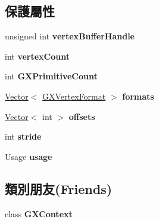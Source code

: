 \subsection*{保護屬性}
\begin{DoxyCompactItemize}
\item 
unsigned int {\bfseries vertex\+Buffer\+Handle}\hypertarget{class_magnum_1_1_g_x_vertex_buffer_a10a0060080e621236efd9d2963b33626}{}\label{class_magnum_1_1_g_x_vertex_buffer_a10a0060080e621236efd9d2963b33626}

\item 
int {\bfseries vertex\+Count}\hypertarget{class_magnum_1_1_g_x_vertex_buffer_a82018f762d07790a31d321907da5153f}{}\label{class_magnum_1_1_g_x_vertex_buffer_a82018f762d07790a31d321907da5153f}

\item 
int {\bfseries G\+X\+Primitive\+Count}\hypertarget{class_magnum_1_1_g_x_vertex_buffer_a2baf08936954b7b82dab77f8335a90ce}{}\label{class_magnum_1_1_g_x_vertex_buffer_a2baf08936954b7b82dab77f8335a90ce}

\item 
\hyperlink{class_magnum_1_1_vector}{Vector}$<$ \hyperlink{class_magnum_1_1_g_x_vertex_format}{G\+X\+Vertex\+Format} $>$ {\bfseries formats}\hypertarget{class_magnum_1_1_g_x_vertex_buffer_a9c40750568c4c8840887b7c64f5a04cd}{}\label{class_magnum_1_1_g_x_vertex_buffer_a9c40750568c4c8840887b7c64f5a04cd}

\item 
\hyperlink{class_magnum_1_1_vector}{Vector}$<$ int $>$ {\bfseries offsets}\hypertarget{class_magnum_1_1_g_x_vertex_buffer_a7cc66464e9a33ade285492b29d11f60c}{}\label{class_magnum_1_1_g_x_vertex_buffer_a7cc66464e9a33ade285492b29d11f60c}

\item 
int {\bfseries stride}\hypertarget{class_magnum_1_1_g_x_vertex_buffer_a785a4db8d78a4275d2d4d985e9daa7e1}{}\label{class_magnum_1_1_g_x_vertex_buffer_a785a4db8d78a4275d2d4d985e9daa7e1}

\item 
Usage {\bfseries usage}\hypertarget{class_magnum_1_1_g_x_vertex_buffer_a86b4f3eaf2af97fa7c79dadf4e588c7b}{}\label{class_magnum_1_1_g_x_vertex_buffer_a86b4f3eaf2af97fa7c79dadf4e588c7b}

\end{DoxyCompactItemize}
\subsection*{類別朋友(Friends)}
\begin{DoxyCompactItemize}
\item 
class {\bfseries G\+X\+Context}\hypertarget{class_magnum_1_1_g_x_vertex_buffer_a2c36d7f8865080802bbad88cd73d871c}{}\label{class_magnum_1_1_g_x_vertex_buffer_a2c36d7f8865080802bbad88cd73d871c}

\end{DoxyCompactItemize}


